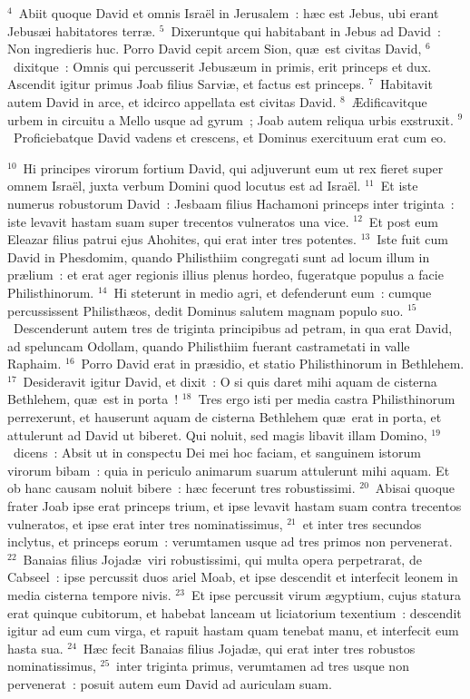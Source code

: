 ${}^{4}$~Abiit quoque David et omnis Isra\"el in Jerusalem~: h\ae c est Jebus, ubi erant Jebus\ae i habitatores terr\ae .
${}^{5}$~Dixeruntque qui habitabant in Jebus ad David~: Non ingredieris huc. Porro David cepit arcem Sion, qu\ae\ est civitas David,
${}^{6}$~dixitque~: Omnis qui percusserit Jebus\ae um in primis, erit princeps et dux. Ascendit igitur primus Joab filius Sarvi\ae , et factus est princeps.
${}^{7}$~Habitavit autem David in arce, et idcirco appellata est civitas David.
${}^{8}$~\AE dificavitque urbem in circuitu a Mello usque ad gyrum~; Joab autem reliqua urbis exstruxit.
${}^{9}$~Proficiebatque David vadens et crescens, et Dominus exercituum erat cum eo.


${}^{10}$~Hi principes virorum fortium David, qui adjuverunt eum ut rex fieret super omnem Isra\"el, juxta verbum Domini quod locutus est ad Isra\"el.
${}^{11}$~Et iste numerus robustorum David~: Jesbaam filius Hachamoni princeps inter triginta~: iste levavit hastam suam super trecentos vulneratos una vice.
${}^{12}$~Et post eum Eleazar filius patrui ejus Ahohites, qui erat inter tres potentes.
${}^{13}$~Iste fuit cum David in Phesdomim, quando Philisthiim congregati sunt ad locum illum in pr\ae lium~: et erat ager regionis illius plenus hordeo, fugeratque populus a facie Philisthinorum.
${}^{14}$~Hi steterunt in medio agri, et defenderunt eum~: cumque percussissent Philisth\ae os, dedit Dominus salutem magnam populo suo.
${}^{15}$~Descenderunt autem tres de triginta principibus ad petram, in qua erat David, ad speluncam Odollam, quando Philisthiim fuerant castrametati in valle Raphaim.
${}^{16}$~Porro David erat in pr\ae sidio, et statio Philisthinorum in Bethlehem.
${}^{17}$~Desideravit igitur David, et dixit~: O si quis daret mihi aquam de cisterna Bethlehem, qu\ae\ est in porta~!
${}^{18}$~Tres ergo isti per media castra Philisthinorum perrexerunt, et hauserunt aquam de cisterna Bethlehem qu\ae\ erat in porta, et attulerunt ad David ut biberet. Qui noluit, sed magis libavit illam Domino,
${}^{19}$~dicens~: Absit ut in conspectu Dei mei hoc faciam, et sanguinem istorum virorum bibam~: quia in periculo animarum suarum attulerunt mihi aquam. Et ob hanc causam noluit bibere~: h\ae c fecerunt tres robustissimi.
${}^{20}$~Abisai quoque frater Joab ipse erat princeps trium, et ipse levavit hastam suam contra trecentos vulneratos, et ipse erat inter tres nominatissimus,
${}^{21}$~et inter tres secundos inclytus, et princeps eorum~: verumtamen usque ad tres primos non pervenerat.
${}^{22}$~Banaias filius Jojad\ae\ viri robustissimi, qui multa opera perpetrarat, de Cabseel~: ipse percussit duos ariel Moab, et ipse descendit et interfecit leonem in media cisterna tempore nivis.
${}^{23}$~Et ipse percussit virum \ae gyptium, cujus statura erat quinque cubitorum, et habebat lanceam ut liciatorium texentium~: descendit igitur ad eum cum virga, et rapuit hastam quam tenebat manu, et interfecit eum hasta sua.
${}^{24}$~H\ae c fecit Banaias filius Jojad\ae , qui erat inter tres robustos nominatissimus,
${}^{25}$~inter triginta primus, verumtamen ad tres usque non pervenerat~: posuit autem eum David ad auriculam suam.


